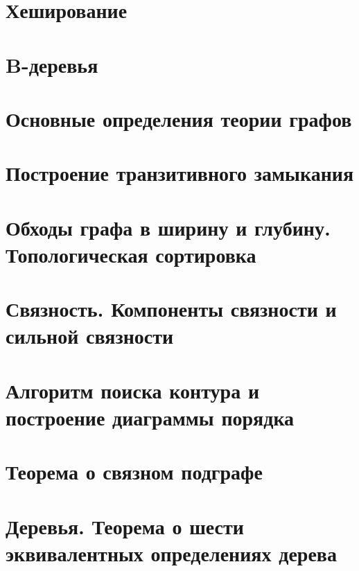 \documentclass[12pt, fleqn]{article}
\begin{document}
\section{Хеширование}




\section{B-деревья}




\section{Основные определения теории графов}


\section{Построение транзитивного замыкания}


\section{Обходы графа в ширину и глубину. Топологическая сортировка}


\section{Связность. Компоненты связности и сильной связности}


\section{Алгоритм поиска контура и построение диаграммы порядка}


\section{Теорема о связном подграфе}


\section{Деревья. Теорема о шести эквивалентных определениях дерева}
\end{document}
